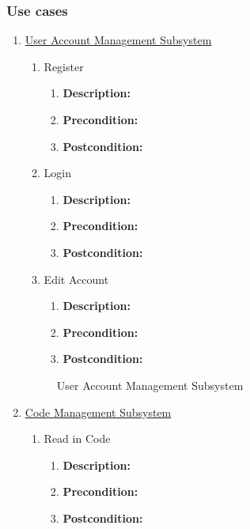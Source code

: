 \documentclass{article}
\begin{document}
	\subsubsection{Use cases}
	\begin{enumerate}
		\item \underline{User Account Management Subsystem}
			
		
	\begin{enumerate}
		\item Register
		\begin{enumerate}
			\item \textbf{Description:} 
			\item \textbf{Precondition:}
			\item \textbf{Postcondition:}\newline
		\end{enumerate}
		
		\item Login
		\begin{enumerate}
			\item \textbf{Description:} 
			\item \textbf{Precondition:}
			\item \textbf{Postcondition:}\newline
		\end{enumerate}
		
		
		\item Edit Account
		\begin{enumerate}
			\item \textbf{Description:} 
			\item \textbf{Precondition:} 
			\item \textbf{Postcondition:}\newline
		\end{enumerate}
	\end{enumerate}
	\begin{figure}[h!]
		\caption{User Account Management Subsystem}	
	\end{figure}
	
	
	\item \underline{Code Management Subsystem}
    \begin{enumerate}
    	\item Read in Code
		\begin{enumerate}
			\item \textbf{Description:} 
			\item \textbf{Precondition:}
			\item \textbf{Postcondition:}\newline
		\end{enumerate}
        

\end{enumerate}
\end{enumerate}
\end{document}
